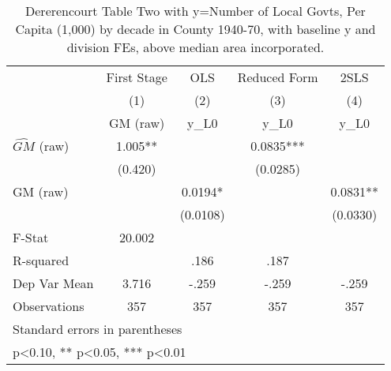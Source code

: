 \begin{table}[htbp]\centering
\def\sym#1{\ifmmode^{#1}\else\(^{#1}\)\fi}
\caption{Dererencourt Table Two with y=Number of Local Govts, Per Capita (1,000) by decade in County 1940-70, with baseline y and division FEs, above median area incorporated.}
\begin{tabular}{l*{4}{c}}
\toprule
                    & First Stage   &         OLS   &Reduced Form   &        2SLS   \\
                    &\multicolumn{1}{c}{(1)}&\multicolumn{1}{c}{(2)}&\multicolumn{1}{c}{(3)}&\multicolumn{1}{c}{(4)}\\
                    &\multicolumn{1}{c}{GM  (raw)}&\multicolumn{1}{c}{y\_L0}&\multicolumn{1}{c}{y\_L0}&\multicolumn{1}{c}{y\_L0}\\
\midrule
$\hat{GM}$ (raw)    &       1.005** &               &      0.0835***&               \\
                    &     (0.420)   &               &    (0.0285)   &               \\
\addlinespace
GM  (raw)           &               &      0.0194*  &               &      0.0831** \\
                    &               &    (0.0108)   &               &    (0.0330)   \\
\midrule
F-Stat              &      20.002   &               &               &               \\
R-squared           &               &        .186   &        .187   &               \\
Dep Var Mean        &       3.716   &       -.259   &       -.259   &       -.259   \\
Observations        &         357   &         357   &         357   &         357   \\
\bottomrule
\multicolumn{5}{l}{\footnotesize Standard errors in parentheses}\\
\multicolumn{5}{l}{\footnotesize * p<0.10, ** p<0.05, *** p<0.01}\\
\end{tabular}
\end{table}

